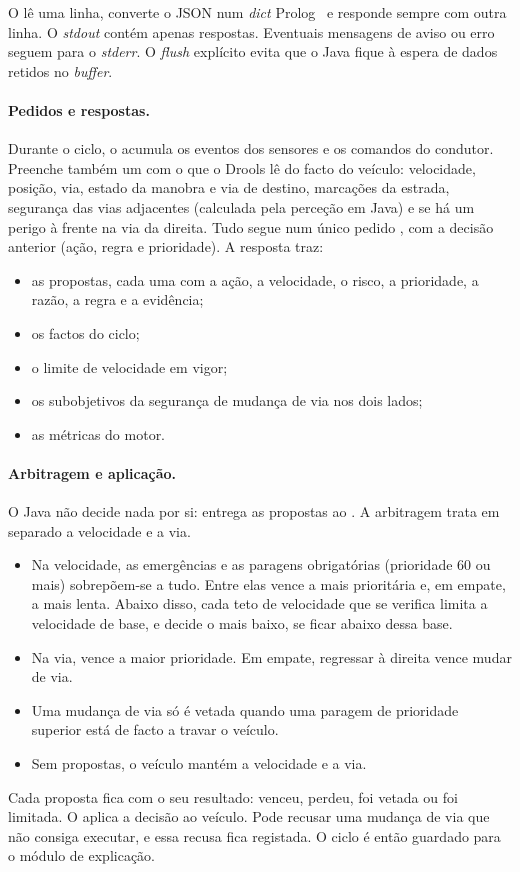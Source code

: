 O  lê uma linha, converte o JSON num \emph{dict} Prolog~\cite{swijson} e
responde sempre com outra linha. O \emph{stdout} contém apenas respostas.
Eventuais mensagens de aviso ou erro seguem para o \emph{stderr}. O \emph{flush}
explícito evita que o Java fique à espera de dados retidos no \emph{buffer}.

\paragraph{Pedidos e respostas.} Durante o ciclo, o  acumula
os eventos dos sensores e os comandos do condutor. Preenche também um
 com o que o Drools lê do facto do veículo: velocidade,
posição, via, estado da manobra e via de destino, marcações da estrada,
segurança das vias adjacentes (calculada pela perceção em Java) e se há um
perigo à frente na via da direita. Tudo segue num único pedido , com
a decisão anterior (ação, regra e prioridade). A resposta traz:

\begin{itemize}
  \item as propostas, cada uma com a ação, a velocidade, o risco, a prioridade,
    a razão, a regra e a evidência;
  \item os factos do ciclo;
  \item o limite de velocidade em vigor;
  \item os subobjetivos da segurança de mudança de via nos dois lados;
  \item as métricas do motor.
\end{itemize}

\paragraph{Arbitragem e aplicação.} O Java não decide nada por si: entrega as
propostas ao . A
arbitragem trata em separado a velocidade e a via.

\begin{itemize}
  \item Na velocidade, as emergências e as paragens obrigatórias (prioridade 60
    ou mais) sobrepõem-se a tudo. Entre elas vence a mais prioritária e, em
    empate, a mais lenta. Abaixo disso, cada teto de velocidade que se verifica
    limita a velocidade de base, e decide o mais baixo, se ficar abaixo dessa
    base.
  \item Na via, vence a maior prioridade. Em empate, regressar à direita vence
    mudar de via.
  \item Uma mudança de via só é vetada quando uma paragem de prioridade
    superior está de facto a travar o veículo.
  \item Sem propostas, o veículo mantém a velocidade e a via.
\end{itemize}

Cada proposta fica com o seu resultado: venceu, perdeu, foi vetada ou foi
limitada. O  aplica a decisão ao veículo. Pode recusar uma
mudança de via que não consiga executar, e essa recusa fica registada. O ciclo
é então guardado para o módulo de explicação.
